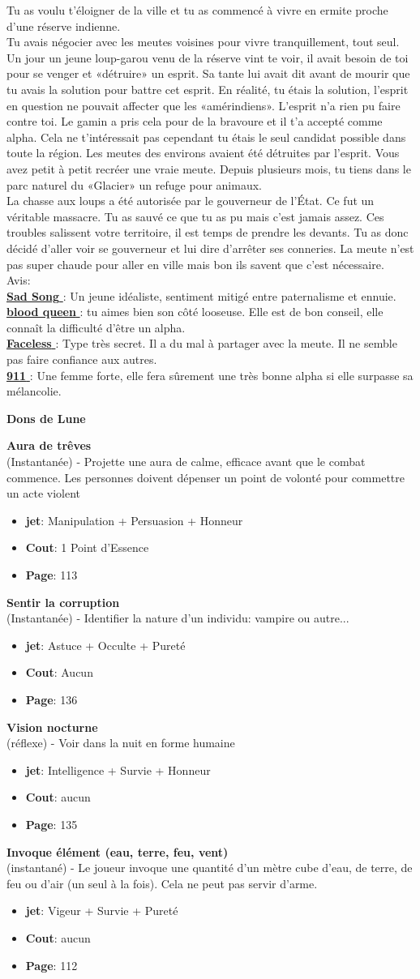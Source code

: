 \documentclass[oneside,12pt]{book}
\newcommand\don[6]{
\textbf{#1} \\
(#6) - #2
\begin{itemize}
\item{ \textbf{jet}: #3}
\item{ \textbf{Cout}: #4}
\item{ \textbf{Page}: #5}
\end{itemize}
\vspace{0.5cm}
}
\newcommand{\Mathew}{\textbf{Sad Song} }
\newcommand{\Laura}{\textbf{blood queen} }
\newcommand{\Andy}{\textbf{Faceless} }
\newcommand{\Kelly}{\textbf{911} }
\begin{document}
\begin{flushleft}
\begin{description}
{Tu as voulu t’éloigner de la ville et tu as commencé à vivre en ermite proche d'une réserve indienne. \\
Tu avais négocier avec les meutes voisines pour vivre tranquillement, tout seul. Un jour un jeune loup-garou venu de la réserve vint te voir, il avait besoin de toi pour se venger et «détruire» un esprit. Sa tante lui avait dit avant de mourir que tu avais la solution pour battre cet esprit. En réalité, tu étais la solution, l’esprit en question ne pouvait affecter que les «amérindiens». L'esprit n'a rien pu faire contre toi. Le gamin a pris cela pour de la bravoure et il t’a accepté comme alpha. Cela ne t’intéressait pas cependant tu étais le seul candidat possible dans toute la région. Les meutes des environs avaient été détruites par l’esprit.
Vous avez petit à petit recréer une vraie meute. 
Depuis plusieurs mois, tu tiens dans le parc naturel du «Glacier» un refuge pour animaux. \\
La chasse aux loups a été autorisée par le gouverneur de l’État. Ce fut un véritable massacre. Tu as sauvé ce que tu as pu mais c'est jamais assez. Ces troubles salissent votre territoire, il est temps de prendre les devants. Tu as donc décidé d'aller voir se gouverneur et lui dire d’arrêter ses conneries. La meute n’est pas super chaude pour aller en ville mais bon ils savent que c’est nécessaire. \\

Avis:\\
\underline{\Mathew} : Un jeune idéaliste, sentiment mitigé entre paternalisme et ennuie.\\
\underline{\Laura} : tu aimes bien son côté looseuse. Elle est de bon conseil, elle connaît la difficulté d'être un alpha.  \\
\underline{\Andy} : Type très secret. Il a du mal à partager avec la meute. Il ne semble pas faire confiance aux autres. \\
\underline{\Kelly} : Une femme forte, elle fera sûrement une très bonne alpha si elle surpasse sa mélancolie. \\
}
\end{description}
\clearpage
\textbf{\large Dons de Lune} \\
\vspace{0.5cm}
\don{Aura de trêves}{Projette une aura de calme, efficace avant que le combat commence. Les personnes doivent dépenser un point de volonté pour commettre un acte violent}{Manipulation + Persuasion + Honneur}{1 Point d’Essence}{113}{Instantanée}
\don{Sentir la corruption}{Identifier la nature d'un individu: vampire ou autre...}{Astuce + Occulte + Pureté}{Aucun}{136}{Instantanée}
\don{Vision nocturne}{Voir dans la nuit en forme humaine}{Intelligence + Survie + Honneur}{aucun}{135}{réflexe}
\don{Invoque élément (eau, terre, feu, vent)}{Le joueur invoque une quantité d’un mètre cube d’eau, de terre, de feu ou d’air (un seul à la fois). Cela ne peut pas servir d’arme.}{Vigeur + Survie + Pureté}{aucun}{112}{instantané}


\end{flushleft}
\end{document}
